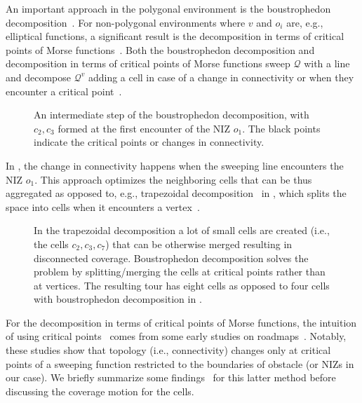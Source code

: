 An important approach in the polygonal environment is the boustrophedon decomposition~\citep{choset2000coverage}. For non-polygonal environments where $v$ and $o_i$ are, e.g., elliptical functions, a significant result is the decomposition in terms of critical points of Morse functions~\citep{choset2000exact}. Both the boustrophedon decomposition and decomposition in terms of critical points of Morse functions sweep $\mathcal{Q}$ with a line and decompose $\mathcal{Q}^v$ adding a cell in case of a change in connectivity or when they encounter a critical point~\citep{choset2000coverage,choset2001coverage,choset2005principles}. 
\begin{figure}[h]
  \centering
  \selectfont
  
  \caption[Intermediate step of the boustrophedon decomposition]{An intermediate step of the boustrophedon decomposition, with $c_2,c_3$ formed at the first encounter of the NIZ $o_1$. The black points indicate the critical points or changes in connectivity.
  }
  \label{fig:bcd3}
\end{figure}
In , the change in connectivity happens when the sweeping line encounters the NIZ $o_1$. This approach optimizes the neighboring cells that can be thus aggregated as opposed to, e.g., trapezoidal decomposition~\citep{galceran2013survey} in , which splits the space into cells when it encounters a vertex~\citep{lavalle2006planning}.
\begin{figure}[h]
  \centering
  \selectfont
  
  \caption[Trapezoidal decomposition]{In the trapezoidal decomposition a lot of small cells are created (i.e., the cells $c_2,c_3,c_7$) that can be otherwise merged resulting in disconnected coverage. Boustrophedon decomposition solves the problem by splitting/merging the cells at critical points rather than at vertices. The resulting tour has eight cells as opposed to four cells with boustrophedon decomposition in .}
  \label{fig:trap}
\end{figure}
For the decomposition in terms of critical points of Morse functions, the intuition of using critical points~\citep{choset2000exact} comes from some early studies on roadmaps~\citep{canny1988complexity,canny1988constructing,canny1993opportunistic}. Notably, these studies show that topology (i.e., connectivity) changes only at critical points of a sweeping function restricted to the boundaries of obstacle (or NIZs in our case). We briefly summarize some findings~\citep{choset2000exact} for this latter method before discussing the coverage motion for the cells.

